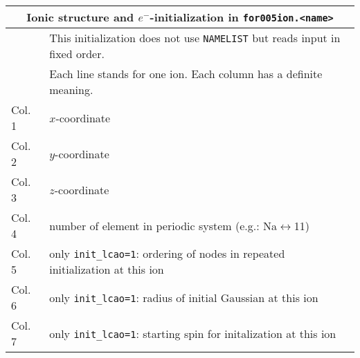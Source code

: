\documentclass[12pt]{article}
\begin{document}
\vspace*{2cm}

\begin{tabular}{ll}
\hline
\multicolumn{2}{c}{Ionic structure and $e^-$-initialization in {\tt for005ion.<name>}} \\
\hline
& This initialization does not use {\tt NAMELIST} but reads
 input in fixed order.\\
& Each line stands for one ion. Each column has a definite meaning.\\
Col. 1 &  $x$-coordinate \\
Col. 2 &  $y$-coordinate \\
Col. 3 &  $z$-coordinate \\
Col. 4 & 
   number of element in periodic system (e.g.: Na$\leftrightarrow$11)\\
Col. 5 & only {\tt init\_lcao=1}: ordering of nodes in repeated
    initialization at this ion\\
Col. 6 & only {\tt init\_lcao=1}: radius of initial Gaussian at 
    this ion\\
Col. 7 & only {\tt init\_lcao=1}: starting spin for initalization at
    this ion\\
\hline
\end{tabular}
\\[8pt]
\end{document}
